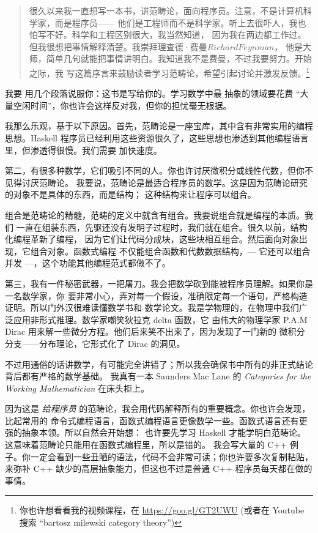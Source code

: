 
\begin{quote}
  很久以来我一直想写一本书，讲范畴论，面向程序员。注意，不是计算机科学家，而是程序员——
  他们是工程师而不是科学家。听上去很吓人，我也怕写不好。科学和工程区别很大，我当然知道，
  因为我在两边都工作过。但我很想把事情解释清楚。我崇拜理查德·费曼\(Richard Feynman\)，
  他是大师，简单几句就能把事情讲明白。我知道我不是费曼，不过我要努力。开始之际，我
  写这篇序言来鼓励读者学习范畴论，希望引起讨论并激发反馈。\footnote{
    你也许想看看我的视频课程，在
    \href{https://goo.gl/GT2UWU}{https://goo.gl/GT2UWU} (或者在 Youtube 搜索
    ``bartosz milewski category theory'')}
\end{quote}

\lettrine[lhang=0.17]{我}{要} 用几个段落说服你：这书是写给你的。学习数学中最
抽象的领域要花费 ``大量空闲时间''，你也许会这样反对我，但你的担忧毫无根据。

我那么乐观，基于以下原因。首先，范畴论是一座宝库，其中含有非常实用的编程思想。Haskell
程序员已经利用这些资源很久了，这些思想也渗透到其他编程语言里，但渗透得很慢。我们需要
加快速度。

第二，有很多种数学，它们吸引不同的人。你也许讨厌微积分或线性代数，但你不见得讨厌范畴论。
我要说，范畴论是最适合程序员的数学。这是因为范畴论研究的对象不是具体的东西，而是结构；
这种结构来让程序可以组合。

组合是范畴论的精髓，范畴的定义中就含有组合。我要说组合就是编程的本质。我们
一直在组装东西，先驱还没有发明子过程时，我们就在组合。很久以前，结构化编程革新了编程，
因为它们让代码分成块，这些块相互组合。然后面向对象出现，它组合对象。函数式编程
不仅能组合函数和代数数据结构，--- 它还可以组合并发 ---，这个功能其他编程范式都做不了。

第三，我有一件秘密武器，一把屠刀。我会把数学砍到能被程序员理解。如果你是一名数学家，你
要非常小心，弄对每一个假设，准确限定每一个语句，严格构造证明。所以门外汉很难读懂数学书和
数学论文。我是学物理的，在物理中我们广泛应用非形式推理。数学家嘲笑狄拉克 delta 函数，它
由伟大的物理学家 P.A.M Dirac 用来解一些微分方程。他们后来笑不出来了，因为发现了一门新的
微积分分支——分布理论，它形式化了 Dirac 的洞见。

不过用通俗的话讲数学，有可能完全讲错了；所以我会确保书中所有的非正式结论背后都有严格的数学基础。
我真有一本 Saunders Mac Lane 的 \emph{Categories for the Working Mathematician}
在床头柜上。

因为这是 \emph{给程序员} 的范畴论，我会用代码解释所有的重要概念。你也许会发现，比起常用的
命令式编程语言，函数式编程语言更像数学一些。函数式语言还有更强的抽象本领。所以自然会开始想：
也许要先学习 Haskell 才能学明白范畴论。这意味着范畴论只能用在函数式编程里，所以是错的。
我会写大量的 C++ 例子。你一定会看到一些丑陋的语法，代码不会非常可读；你也许要多次复制粘贴，
来弥补 C++ 缺少的高层抽象能力，但这也不过是普通 C++ 程序员每天都在做的事情。


